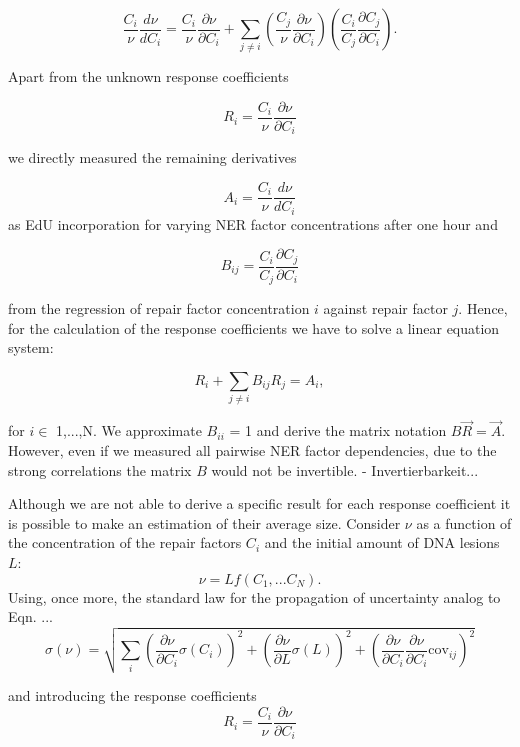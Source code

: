 \begin{equation}
 \frac{C_i}{\nu}\frac{d \nu}{d C_i} = \frac{C_i}{\nu}\frac{\partial \nu}{\partial C_i} + \sum_{j \neq i} \left( \frac{C_j}{\nu}\frac{\partial \nu}{\partial C_i}\right) \left(\frac{C_i}{C_j}\frac{\partial C_j}{\partial C_i}\right). 
\end{equation}    

Apart from the unknown response coefficients

\begin{equation}
	R_i = \frac{C_i}{\nu}\frac{\partial \nu}{\partial C_i} \nonumber
\end{equation}

we directly measured the remaining derivatives 

\begin{equation}
A_i = \frac{C_i}{\nu}\frac{d \nu}{d C_i} \nonumber
\end{equation}
as EdU incorporation for varying NER factor concentrations after one hour and

\begin{equation}
B_{ij} = \frac{C_i}{C_j}\frac{\partial C_j}{\partial C_i} \nonumber
\end{equation}

from the regression of repair factor concentration $i$ against repair factor $j$. Hence, for the calculation of the response coefficients we have to solve a linear equation system:

\begin{equation}
	R_i + \sum_{j\neq i} B_{ij}R_j = A_i,
\end{equation}

for $i \in$ 1,...,N. We approximate $B_{ii}$ = 1 and derive the matrix notation $B\vec{R}=\vec{A}$. However, even if we measured all pairwise NER factor dependencies, due to the strong correlations the matrix $B$ would not be invertible.
- Invertierbarkeit...

Although we are not able to derive a specific result for each response coefficient it is possible to make an estimation of their average size. Consider $\nu$ as a function of the concentration of the repair factors $C_i$ and the initial amount of DNA lesions $L$:
\begin{equation}
	\nu = Lf(C_1,...C_N).
\end{equation}
Using, once more, the standard law for the propagation of uncertainty analog to Eqn. ...
 \begin{equation}
 \sigma(\nu) = \sqrt{\sum_{i}\left(\frac{\partial \nu}{\partial C_i}\sigma(C_i) \right)^2 + \left(\frac{\partial \nu}{\partial L}\sigma(L)\right)^2 + \left(\frac{\partial \nu}{\partial C_i} \frac{\partial \nu}{\partial C_i}\textrm{cov}_{ij}\right)^2}
 \end{equation}  
 
 and introducing the response coefficients 
 \begin{equation}
 R_i = \frac{C_i}{\nu}\frac{\partial \nu}{\partial C_i} \nonumber
 \end{equation}
